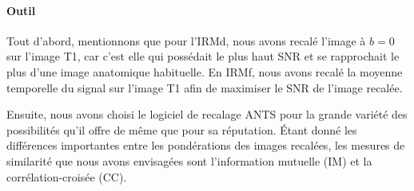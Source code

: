\documentclass[a4paper]{article}
\begin{document}
\paragraph{Outil}
Tout d'abord, mentionnons que pour l'IRMd, nous avons recalé l'image à $b=0$ sur l'image T1, car c'est elle qui possédait le plus haut SNR et se rapprochait le plus d'une image anatomique habituelle. En IRMf, nous avons recalé la moyenne temporelle du signal sur l'image T1 afin de maximiser le SNR de l'image recalée.  

Ensuite, nous avons choisi le logiciel de recalage ANTS pour la grande variété des possibilités qu'il offre de même que pour sa réputation. Étant donné les différences importantes entre les pondérations des images recalées, les mesures de similarité que nous avons envisagées sont l'information mutuelle (IM) et la corrélation-croisée (CC). 
\end{document}
